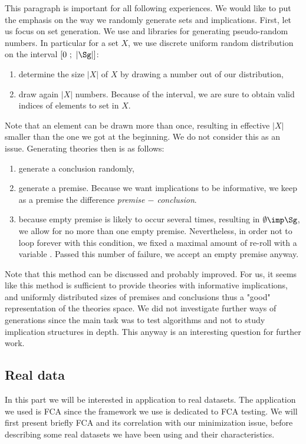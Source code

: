 This paragraph is important for all following experiences.
We would like to put the emphasis on the way we randomly generate sets and 
implications. First, let us focus on set generation. We use  
and  libraries for generating pseudo-random numbers. In particular 
for a set $X$, we use discrete uniform random distribution on the interval 
$\lbrack 0 \ ; \ |\Sg| \rbrack$:
\begin{enumerate}
	\item determine the size $|X|$ of $X$ by drawing a number out of our 
	distribution,
	\item draw again $|X|$ numbers. Because of the interval, we are sure to
	obtain valid indices of elements to set in $X$.
\end{enumerate}
\noindent Note that an element can be drawn more than once, resulting in 
effective $|X|$ smaller than the one we got at the beginning. We do not consider
this as an issue. Generating theories then is as follows:
\begin{enumerate}
	\item generate a conclusion randomly,
	\item generate a premise. Because we want implications to be informative,
	we keep as a premise the difference \textit{premise $-$ conclusion}.
	\item because empty premise is likely to occur several times, resulting in
	$\emptyset \imp \Sg$, we allow for no more than one empty premise. 
	Nevertheless, in order not to loop forever with this condition, we fixed
	a maximal amount of re-roll with a variable . Passed this 
	number of failure, we accept an empty premise anyway.
\end{enumerate}
\noindent Note that this method can be discussed and probably improved. For us,
it seems like this method is sufficient to provide theories with informative
implications, and uniformly distributed sizes of premises and conclusions thus
a "good" representation of the theories space. We did not investigate further 
ways of generations since the main task was to test algorithms and not to study
implication structures in depth. This anyway is an interesting question for
further work.

\subsection{Real data}

In this part we will be interested in application to real datasets. The application we used is FCA since the framework we use is dedicated to FCA
testing. We will first present briefly FCA and its correlation with our
minimization issue, before describing some real datasets we have been using
and their characteristics.

